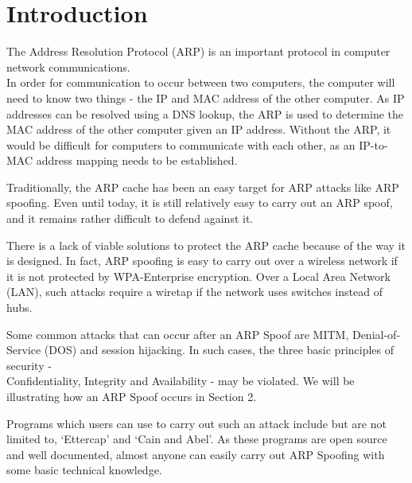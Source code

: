 \documentclass{acm_proc_article-sp}
\begin{document}




\section{Introduction}
The Address Resolution Protocol (ARP) is an important protocol in computer network communications. \\
In order for communication to occur between two computers, the computer will need to know two things - the IP and MAC address of the other computer. As IP addresses can be resolved using a DNS lookup, the ARP is used to determine the MAC address of the other computer given an IP address. Without the ARP, it would be difficult for computers to communicate with each other, as an IP-to-MAC address mapping needs to be established. 

Traditionally, the ARP cache has been an easy target for ARP attacks like ARP spoofing. Even until today, it is still relatively easy to carry out an ARP spoof, and it remains rather difficult to defend against it. 

There is a lack of viable solutions to protect the ARP cache because of the way it is designed. In fact, ARP spoofing is easy to carry out over a wireless network if it is not protected by WPA-Enterprise encryption. Over a Local Area Network (LAN), such attacks require a wiretap if the network uses switches instead of hubs. 

Some common attacks that can occur after an ARP Spoof are MITM, Denial-of-Service (DOS) and session hijacking. 
In such cases, the three basic principles of security -\\ Confidentiality, Integrity and Availability - may be violated. 
We will be illustrating how an ARP Spoof occurs in Section 2. 

Programs which users can use to carry out such an attack include but are not limited to, `Ettercap' and `Cain and Abel'. As these programs are open source and well documented, almost anyone can easily carry out ARP Spoofing with some basic technical knowledge. 
\end{document}
